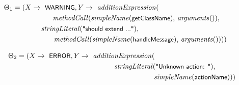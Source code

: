 \begin{align}
\Theta_1 = (X \rightarrow \text{ \textsf{\small WARNING}}, Y \rightarrow \text{ \textit{additionExpression}(}\hspace*{3cm}\nonumber\\
\text{\textit{methodCall}(\textit{simpleName}(\textsf{\small getClassName}), \textit{arguments}()),}\nonumber\\
\text{\textit{stringLiteral}(\textsf{\small "should extend ..."}),}\hspace*{4cm}\nonumber\\ 
\text{\textit{methodCall}(\textit{simpleName}(\textsf{\small handleMessage}), \textit{arguments}()))})\hspace*{-1em}\label{eq:theta1}
\end{align}

\begin{align}
\Theta_2 = (X \rightarrow \text{ \textsf{\small ERROR}}, Y \rightarrow \text{ \textit{additionExpression}(}\hspace*{3cm}\nonumber\\
\text{\textit{stringLiteral}(\textsf{\small "Unknown action: "})},\nonumber\\
\text{ \textit{simpleName}(\textsf{\small actionName}))})\hspace*{-1cm}\label{eq:theta2}
\end{align}


